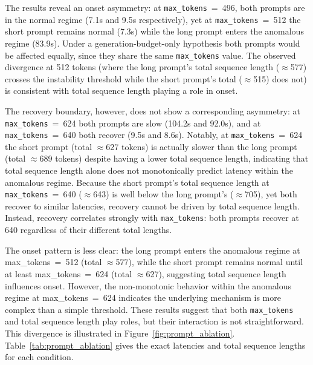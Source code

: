 \documentclass{article}
\begin{document}
The results reveal an onset asymmetry: at \texttt{max\_tokens}~=~496, both prompts are in the normal regime (7.1s and 9.5s respectively), yet at \texttt{max\_tokens}~=~512 the short prompt remains normal (7.3s) while the long prompt enters the anomalous regime (83.9s).
Under a generation-budget-only hypothesis both prompts would be affected equally, since they share the same \texttt{max\_tokens} value.
The observed divergence at 512 tokens (where the long prompt's total sequence length ($\approx$577) crosses the instability threshold while the short prompt's total ($\approx$515) does not) is consistent with total sequence length playing a role in onset.

The recovery boundary, however, does not show a corresponding asymmetry: at \texttt{max\_tokens}~=~624 both prompts are slow (104.2s and 92.0s), and at \texttt{max\_tokens}~=~640 both recover (9.5s and 8.6s).
Notably, at \texttt{max\_tokens}~=~624 the short prompt (total $\approx$627 tokens) is actually slower than the long prompt (total $\approx$689 tokens) despite having a lower total sequence length, indicating that total sequence length alone does not monotonically predict latency within the anomalous regime.
Because the short prompt's total sequence length at \texttt{max\_tokens}~=~640 ($\approx$643) is well below the long prompt's ($\approx$705), yet both recover to similar latencies, recovery cannot be driven by total sequence length.
Instead, recovery correlates strongly with \texttt{max\_tokens}: both prompts recover at 640 regardless of their different total lengths.

The onset pattern is less clear: the long prompt enters the anomalous regime at max\_tokens~=~512 (total $\approx$577), while the short prompt remains normal until at least max\_tokens~=~624 (total $\approx$627), suggesting total sequence length influences onset. However, the non-monotonic behavior within the anomalous regime at max\_tokens~=~624 indicates the underlying mechanism is more complex than a simple threshold. These results suggest that both \texttt{max\_tokens} and total sequence length play roles, but their interaction is not straightforward. This divergence is illustrated in Figure~\ref{fig:prompt_ablation}.
Table~\ref{tab:prompt_ablation} gives the exact latencies and total sequence lengths for each condition.
\end{document}
